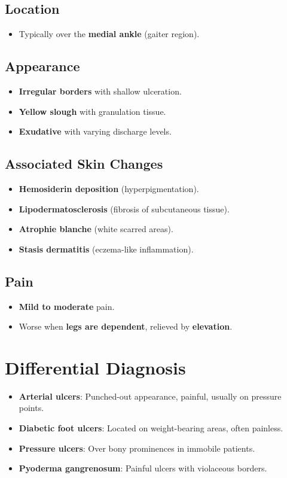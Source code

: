 \documentclass{article}
\begin{document}
\subsection{Location}
\begin{itemize}
    \item Typically over the \textbf{medial ankle} (gaiter region).
\end{itemize}

\subsection{Appearance}
\begin{itemize}
    \item \textbf{Irregular borders} with shallow ulceration.
    \item \textbf{Yellow slough} with granulation tissue.
    \item \textbf{Exudative} with varying discharge levels.
\end{itemize}

\subsection{Associated Skin Changes}
\begin{itemize}
    \item \textbf{Hemosiderin deposition} (hyperpigmentation).
    \item \textbf{Lipodermatosclerosis} (fibrosis of subcutaneous tissue).
    \item \textbf{Atrophie blanche} (white scarred areas).
    \item \textbf{Stasis dermatitis} (eczema-like inflammation).
\end{itemize}

\subsection{Pain}
\begin{itemize}
    \item \textbf{Mild to moderate} pain.
    \item Worse when \textbf{legs are dependent}, relieved by \textbf{elevation}.
\end{itemize}

\section{Differential Diagnosis}
\begin{itemize}
    \item \textbf{Arterial ulcers}: Punched-out appearance, painful, usually on pressure points.
    \item \textbf{Diabetic foot ulcers}: Located on weight-bearing areas, often painless.
    \item \textbf{Pressure ulcers}: Over bony prominences in immobile patients.
    \item \textbf{Pyoderma gangrenosum}: Painful ulcers with violaceous borders.
\end{itemize}
\end{document}
